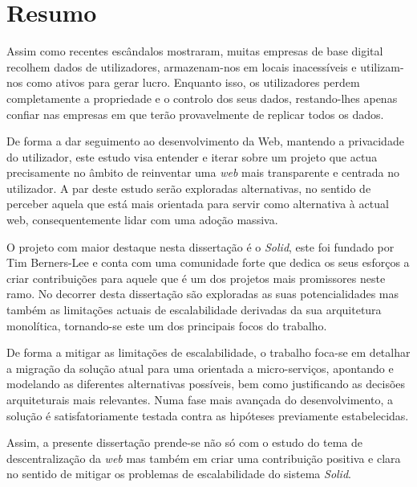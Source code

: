 \chapter*{Resumo}
Assim como recentes escândalos mostraram, muitas empresas de base digital recolhem dados de utilizadores, armazenam-nos em locais inacessíveis e utilizam-nos como ativos para gerar lucro. Enquanto isso, os utilizadores perdem completamente a propriedade e o controlo dos seus dados, restando-lhes apenas confiar nas  empresas em que terão provavelmente de replicar todos os dados.

De forma a dar seguimento ao desenvolvimento da Web, mantendo a privacidade do utilizador, este estudo visa entender e iterar sobre um projeto que actua precisamente no âmbito de reinventar uma \emph{web} mais transparente e centrada no utilizador. A par deste estudo serão exploradas alternativas, no sentido de perceber aquela que está mais orientada para servir como alternativa à actual web, consequentemente lidar com uma adoção massiva.

O projeto com maior destaque nesta dissertação é o \emph{Solid}, este foi fundado por Tim Berners-Lee e conta com uma comunidade forte que dedica os seus esforços a criar contribuições para aquele que é um dos projetos mais promissores neste ramo. No decorrer desta dissertação são exploradas as suas potencialidades mas também as limitações actuais de escalabilidade derivadas da sua arquitetura monolítica, tornando-se este um dos principais focos do trabalho.

De forma a mitigar as limitações de escalabilidade, o trabalho foca-se em detalhar a migração da solução atual para uma orientada a micro-serviços, apontando e modelando as diferentes alternativas possíveis, bem como justificando as decisões arquiteturais mais relevantes. Numa fase mais avançada do desenvolvimento, a solução é    satisfatoriamente testada contra as hipóteses previamente estabelecidas.

Assim, a presente dissertação prende-se não só com o estudo do tema de descentralização da \emph{web} mas também em criar uma contribuição positiva e clara no sentido de mitigar os problemas de escalabilidade do sistema \emph{Solid}.

